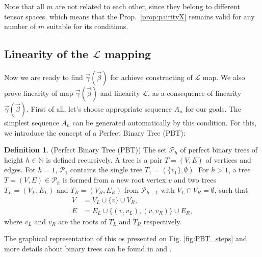 \documentclass[a4paper, openany, 12pt]{article}
\theoremstyle{remark}
\theoremstyle{definition}
\newtheorem{definition}{Definition}[section]
\begin{document}
Note that all $m$ are not related to each other, since they belong to different tensor spaces, which means that the Prop.~\ref{prop:pairityX} remains valid for any number of $m$ suitable for its conditions.


\subsection{Linearity of the $\mathcal{L}$ mapping\label{sec:linearityL}}

Now we are ready to find $\vec\gamma(\vec\beta)$ for achieve constructing of $\mathcal{L}$ map. We also prove linearity of map $\vec\gamma(\vec\beta)$ and linearity $\mathcal{L}$, as a consequence of linearity $\vec\gamma(\vec\beta)$. First of all, let's choose appropriate sequence $A_n$ for our goals.
The simplest sequence $A_n$ can be generated automatically by this condition. For this, we introduce the concept of a Perfect Binary Tree (PBT):

 \begin{definition}(Perfect Binary Tree (PBT)\label{def:PBT})
The set $\mathcal{P}_h$ of perfect binary trees of height $h \in \mathbb{N}$ is defined recursively. A tree is a pair $T=(V,E)$ of vertices and edges.
For $h=1$, $\mathcal{P}_1$ contains the single tree $T_1 = (\{v_1\}, \emptyset)$.
For $h>1$, a tree $T=(V,E) \in \mathcal{P}_h$ is formed from a new root vertex $v$ and two trees $T_L=(V_L, E_L)$ and $T_R=(V_R, E_R)$ from $\mathcal{P}_{h-1}$ with $V_L \cap V_R = \emptyset$, such that
\begin{align}
    V &= V_L \cup \{v\} \cup V_R, \\
    E &= E_L \cup \{ (v, v_L), (v, v_R) \} \cup E_R ,
\end{align}
where $v_L$ and $v_R$ are the roots of $T_L$ and $T_R$ respectively.
\end{definition}

The graphical representation of this os presented on Fig. \ref{fig:PBT_steps} and more details about binary trees can be found in \cite{harder_ece250_pbt} and \cite{Knuth1997TAOCP1}.
\end{document}

